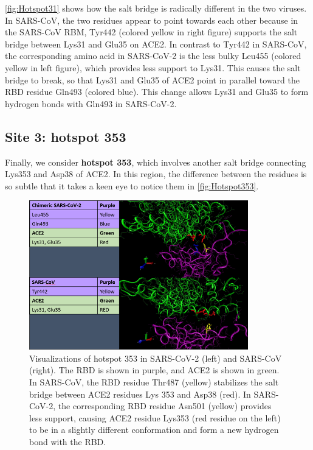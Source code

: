 \autoref{fig:Hotspot31} shows how the salt bridge is radically different in the two viruses. In SARS-CoV, the two residues appear to point towards each other because in the SARS-CoV RBM, Tyr442 (colored yellow in right figure) supports the salt bridge between Lys31 and Glu35 on ACE2. In contrast to Tyr442 in SARS-CoV, the corresponding amino acid in SARS-CoV-2 is the less bulky Leu455 (colored yellow in left figure), which provides less support to Lys31. This causes the salt bridge to break, so that Lys31 and Glu35 of ACE2 point in parallel toward the RBD residue Gln493 (colored blue). This change allows Lys31 and Glu35 to form hydrogen bonds with Gln493 in SARS-CoV-2.

\FloatBarrier
{}
\subsection{Site 3: hotspot 353}

Finally, we consider \textbf{hotspot 353}, which involves another salt bridge connecting Lys353 and Asp38 of ACE2. In this region, the difference between the residues is so subtle that it takes a keen eye to notice them in \autoref{fig:Hotspot353}.

\begin{figure}[h]
	\centering
	\mySfFamily
	\includegraphics[width = 0.85\textwidth]{../images/Hotspot31.png}
	\caption{Visualizations of hotspot 353 in SARS-CoV-2 (left) and SARS-CoV (right). The RBD is shown in purple, and ACE2 is shown in green. In SARS-CoV, the RBD residue Thr487 (yellow) stabilizes the salt bridge between ACE2 residues Lys 353 and Asp38 (red). In SARS-CoV-2, the corresponding RBD residue Asn501 (yellow) provides less support, causing ACE2 residue Lys353 (red residue on the left) to be in a slightly different conformation and form a new hydrogen bond with the RBD.}
	\label{fig:Hotspot353}
\end{figure}

